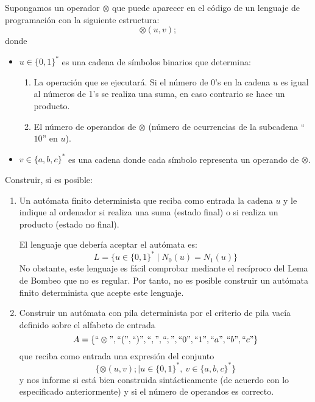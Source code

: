 \begin{ejercicio}\label{ej:1.5.24}
    Supongamos un operador $\otimes$ que puede aparecer en el código de un lenguaje de programación con la siguiente estructura:
    \begin{equation*}
        \otimes(u,v);
    \end{equation*}
    donde
    \begin{itemize}
        \item $u\in {\{0,1\}}^{\ast}$ es una cadena de símbolos binarios que determina:
            \begin{enumerate}
                \item La operación que se ejecutará. Si el número de 0's en la cadena $u$ es igual al números de 1's se realiza una suma, en caso contrario se hace un producto.
                \item El número de operandos de $\otimes$ (número de ocurrencias de la subcadena ``$10$'' en $u$).
            \end{enumerate}
        \item $v\in {\{a,b,c\}}^{\ast}$ es una cadena donde cada símbolo representa un operando de $\otimes$.
    \end{itemize}
    Construir, si es posible:
    \begin{enumerate}
        \item Un autómata finito determinista que reciba como entrada la cadena $u$ y le indique al ordenador si realiza una suma (estado final) o si realiza un producto (estado no final).
        
        El lenguaje que debería aceptar el autómata es:
        \begin{equation*}
            L = \{u\in {\{0,1\}}^{\ast} \mid N_0(u) = N_1(u)\}
        \end{equation*}
        No obstante, este lenguaje es fácil comprobar mediante el recíproco del Lema de Bombeo que no es regular. Por tanto, no es posible construir un autómata finito determinista que acepte este lenguaje.
        \item Construir un autómata con pila determinista por el criterio de pila vacía definido sobre el alfabeto de entrada
            \begin{equation*}
                A = \{``\otimes\text{''}, ``(\text{''}, ``)\text{''}, ``,\text{''}, ``;\text{''}, ``0\text{''}, ``1\text{''}, ``a\text{''}, ``b\text{''}, ``c\text{''}\}
            \end{equation*}
            que reciba como entrada una expresión del conjunto
            \begin{equation*}
                \{\otimes(u,v); \mid u\in {\{0,1\}}^{\ast},\ v\in {\{a,b,c\}}^{\ast}\}
            \end{equation*}
            y nos informe si está bien construida sintácticamente (de acuerdo con lo especificado anteriormente) y si el número de operandos es correcto.


\end{enumerate}
\end{ejercicio}
